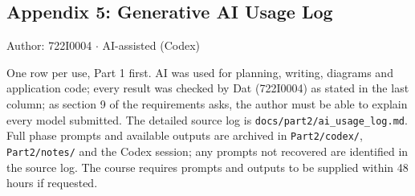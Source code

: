 \subsection*{Appendix 5: Generative AI Usage Log}
Author: 722I0004 \ensuremath{\cdot} AI-assisted (Codex)

One row per use, Part 1 first. AI was used for planning, writing, diagrams and application code; every result was checked by Dat (722I0004) as stated in the last column; as section 9 of the requirements asks, the author must be able to explain every model submitted. The detailed source log is \texttt{docs/\allowbreak{}part2/\allowbreak{}ai\_\allowbreak{}usage\_\allowbreak{}log.\allowbreak{}md}. Full phase prompts and available outputs are archived in \texttt{Part2/\allowbreak{}codex/\allowbreak{}}, \texttt{Part2/\allowbreak{}notes/\allowbreak{}} and the Codex session; any prompts not recovered are identified in the source log. The course requires prompts and outputs to be supplied within 48 hours if requested.

